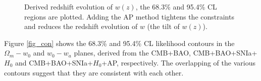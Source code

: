 \documentclass[iop]{emulateapj}
\begin{document}
\begin{figure}
   \caption{\label{fig_wz}
   Derived redshift evolution of $w(z)$, the 68.3\% and 95.4\% CL regions are plotted.
   Adding the AP method tightens the constraints and reduces the redshift evolution of $w$ (the tilt of $w(z)$).
   }
\end{figure}





Figure \ref{fig_con} shows the 68.3\% and 95.4\% CL likelihood contours in the $\Omega_m - w_0$  and $w_0 - w_a$ planes,
derived from the CMB+BAO, CMB+BAO+SNIa+$H_0$ and CMB+BAO+SNIa+$H_0$+AP, respectively.
The overlapping of the various contours suggest that they are consistent with each other.
\end{document}
